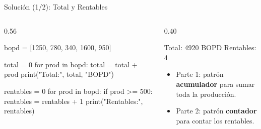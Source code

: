 \documentclass[aspectratio=169, 11pt]{beamer}
\begin{document}
\begin{frame}[fragile,shrink=12]{Solución (1/2): Total y Rentables}
  \vspace{-4pt}
  \begin{columns}[T]
    \begin{column}{0.56\textwidth}
      \begin{pyblock}
bopd = [1250, 780, 340, 1600, 950]

total = 0
for prod in bopd:
    total = total + prod
print("Total:", total, "BOPD")

rentables = 0
for prod in bopd:
    if prod >= 500:
        rentables = rentables + 1
print("Rentables:", rentables)
      \end{pyblock}
    \end{column}

    \begin{column}{0.40\textwidth}
      \begin{outputblock}
Total: 4920 BOPD
Rentables: 4
      \end{outputblock}

      \vspace{5pt}
      {\scriptsize\color{textMuted}
      \begin{itemize}\setlength{\itemsep}{4pt}
        \item[{\color{codeGreen}\scriptsize\faCheck}]
          Parte 1: patrón \textbf{acumulador}
          para sumar toda la producción.
        \item[{\color{codeGreen}\scriptsize\faCheck}]
          Parte 2: patrón \textbf{contador}
          para contar los rentables.
      \end{itemize}
      }
    \end{column}
  \end{columns}
\end{frame}
\end{document}
